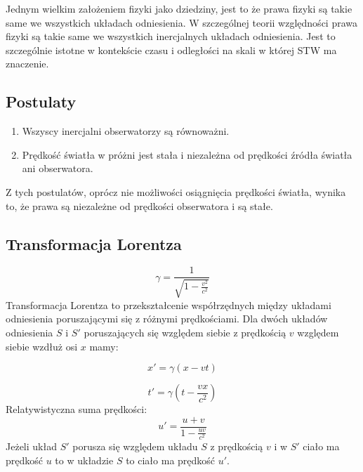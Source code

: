 \documentclass{../notatki}
\begin{document}
Jednym wielkim założeniem fizyki jako dziedziny, jest to że prawa fizyki są
takie same we wszystkich układach odniesienia. W szczególnej teorii względności
prawa fizyki są takie same we wszystkich inercjalnych układach odniesienia.
Jest to szczególnie istotne w kontekście czasu i odległości na skali w której
STW ma znaczenie.

\subsection{Postulaty}

\begin{enumerate}
  \item Wszyscy inercjalni obserwatorzy są równoważni.
  \item Prędkość światła w próżni jest stała i niezależna od prędkości
    źródła światła ani obserwatora.
\end{enumerate}

Z tych postulatów, oprócz nie możliwości osiągnięcia prędkości światła, wynika
to, że prawa są niezależne od prędkości obserwatora i są stałe.

\subsection{Transformacja Lorentza}

$$
\gamma = \frac{1}{\sqrt{1 - \frac{v^2}{c^2}}}
$$
Transformacja Lorentza to przekształcenie współrzędnych między układami
odniesienia poruszającymi się z różnymi prędkościami. Dla dwóch układów
odniesienia $S$ i $S'$ poruszających się względem siebie z prędkością $v$
względem siebie wzdłuż osi $x$ mamy:

$$
x' = \gamma(x - vt)
$$

$$
t' = \gamma(t - \frac{vx}{c^2})
$$
Relatywistyczna suma prędkości:
$$
u' = \frac{u + v}{1 - \frac{uv}{c^2}}
$$
Jeżeli układ $S'$ porusza się względem układu $S$ z prędkością $v$ i
w $S'$ ciało
ma prędkość $u$ to w układzie $S$ to ciało ma prędkość $u'$.

\begin{figure*}[h]
  \centering
\end{figure*}
\end{document}
